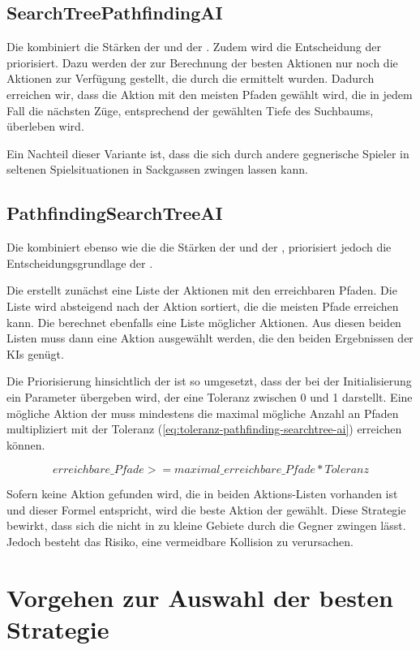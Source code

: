 \subsection{SearchTreePathfindingAI}
\label{subsec:searchtree-pathfinding-ai}

Die  kombiniert die Stärken der  und der .
Zudem wird die Entscheidung der  priorisiert.
Dazu werden der  zur Berechnung der besten Aktionen nur noch die Aktionen zur Verfügung gestellt, die
durch die  ermittelt wurden.
Dadurch erreichen wir, dass die Aktion mit den meisten Pfaden gewählt wird, die in jedem Fall die nächsten Züge,
entsprechend der gewählten Tiefe des Suchbaums, überleben wird.

Ein Nachteil dieser Variante ist, dass die  sich durch andere gegnerische Spieler in
seltenen Spielsituationen in Sackgassen zwingen lassen kann.

\subsection{PathfindingSearchTreeAI}
\label{subsec:pathfinding-searchtree-ai}

Die  kombiniert ebenso wie die  die Stärken der
 und der , priorisiert jedoch die Entscheidungsgrundlage der
.

Die  erstellt zunächst eine Liste der Aktionen mit den erreichbaren Pfaden.
Die Liste wird absteigend nach der Aktion sortiert, die die meisten Pfade erreichen kann.
Die  berechnet ebenfalls eine Liste möglicher Aktionen.
Aus diesen beiden Listen muss dann eine Aktion ausgewählt werden, die den beiden Ergebnissen der \ac{KI}s genügt.

Die Priorisierung hinsichtlich der  ist so umgesetzt, dass der  bei
der Initialisierung ein Parameter übergeben wird, der eine Toleranz zwischen 0 und 1 darstellt.
Eine mögliche Aktion der  muss mindestens die maximal mögliche Anzahl an Pfaden multipliziert mit der
Toleranz (\ref{eq:toleranz-pathfinding-searchtree-ai}) erreichen können.

\begin{equation}
\label{eq:toleranz-pathfinding-searchtree-ai}
erreichbare\_Pfade >= maximal\_erreichbare\_Pfade * Toleranz
\end{equation}

Sofern keine Aktion gefunden wird, die in beiden Aktions-Listen vorhanden ist und dieser Formel entspricht, wird die
beste Aktion der  gewählt.
Diese Strategie bewirkt, dass sich die  nicht in zu kleine Gebiete durch die Gegner
zwingen lässt. Jedoch besteht das Risiko, eine vermeidbare Kollision zu verursachen.

\section{Vorgehen zur Auswahl der besten Strategie}
\label{sec:vorgehen-strategieauswahl}

